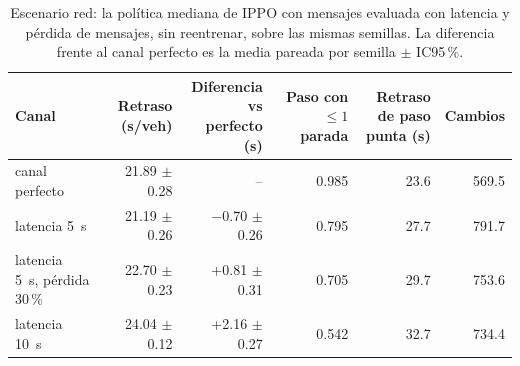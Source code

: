 \begin{table}[H]
\centering
\scriptsize
\setlength{\tabcolsep}{3pt}
\begin{tabular}{lrrrrr}
\toprule
Canal & Retraso (s/veh) & \makecell{Diferencia vs\\perfecto (s)} & \makecell{Paso con\\$\le 1$ parada} & \makecell{Retraso de paso\\punta (s)} & Cambios \\
\midrule
canal perfecto & 21.89 $\pm$ 0.28 & -- & 0.985 & 23.6 & 569.5 \\
latencia 5~s & 21.19 $\pm$ 0.26 & $-$0.70 $\pm$ 0.26 & 0.795 & 27.7 & 791.7 \\
latencia 5~s, pérdida 30\,\% & 22.70 $\pm$ 0.23 & +0.81 $\pm$ 0.31 & 0.705 & 29.7 & 753.6 \\
latencia 10~s & 24.04 $\pm$ 0.12 & +2.16 $\pm$ 0.27 & 0.542 & 32.7 & 734.4 \\
\bottomrule
\end{tabular}
\caption[Escenario red: IPPO con mensajes y canal imperfecto]{Escenario red: la política mediana de IPPO con mensajes evaluada con latencia y pérdida de mensajes, sin reentrenar, sobre las mismas semillas. La diferencia frente al canal perfecto es la media pareada por semilla $\pm$ IC95\,\%.}
\label{tab:red-s1}
\end{table}
